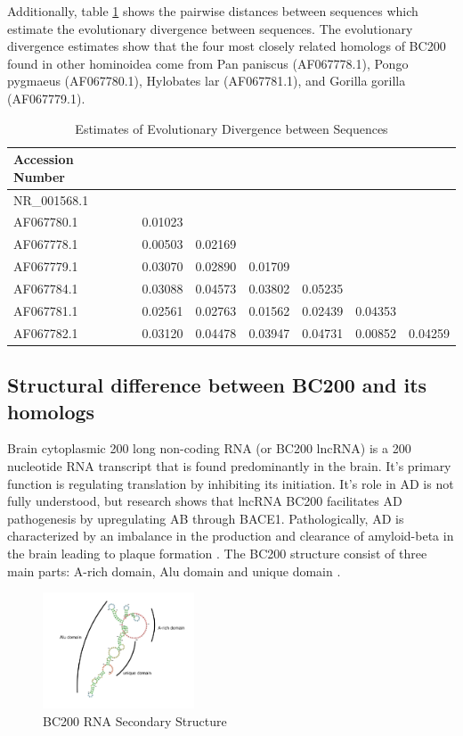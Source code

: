 \documentclass[conference]{IEEEtran}
\begin{document}
Additionally, table \ref{tbl:distances} shows the pairwise distances between sequences which estimate the evolutionary divergence between sequences. 
The evolutionary divergence estimates show that the four most closely related homologs of BC200 found in other hominoidea come from Pan paniscus (AF067778.1), Pongo pygmaeus (AF067780.1), Hylobates lar (AF067781.1), and Gorilla gorilla (AF067779.1). 

\begin{table}[h]
  \centering
  \caption{Estimates of Evolutionary Divergence between Sequences}
  \label{tbl:distances}
  \begin{tabular}{lcccccc}
    \toprule
    Accession Number \\
    \midrule
    NR\_001568.1 \\
    AF067780.1 & 0.01023 \\
    AF067778.1 & 0.00503 & 0.02169 \\
    AF067779.1 & 0.03070 & 0.02890 & 0.01709 \\ 
    AF067784.1 & 0.03088 & 0.04573 & 0.03802 & 0.05235 \\
    AF067781.1 & 0.02561 & 0.02763 & 0.01562 & 0.02439 & 0.04353 \\ 
    AF067782.1 & 0.03120 & 0.04478 & 0.03947 & 0.04731 & 0.00852 & 0.04259 \\
    \bottomrule
  \end{tabular}
\end{table}

\subsection{Structural difference between BC200 and its homologs}

Brain cytoplasmic 200 long non-coding RNA (or BC200 lncRNA) is a 200 nucleotide RNA transcript that is found predominantly in the brain. 
It's primary function is regulating translation by inhibiting its initiation. 
It's role in AD is not fully understood, but research shows that lncRNA BC200 facilitates AD pathogenesis by upregulating AB through BACE1. 
Pathologically, AD is characterized by an imbalance in the production and clearance of amyloid-beta in the brain leading to plaque formation \cite{li2018identification}.
The BC200 structure consist of three main parts: A-rich domain, Alu domain and unique domain \cite{jung2014rna}.

\begin{figure}[h]
  \centering
  \includegraphics[width=0.4\textwidth]{figs/rna-6.png}
  \caption{BC200 RNA Secondary Structure}
  \label{fig:bc200-structure}
\end{figure}
\end{document}
